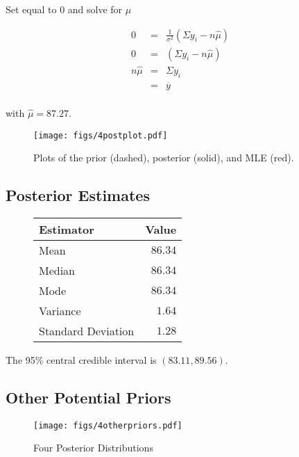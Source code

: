 \documentclass[12pt]{article}
\newcommand{\ybar}{\overline{y}}
\begin{document}
Set equal to 0 and solve for $\hat{\mu}$

\begin{eqnarray*}
0 &=& \frac{1}{\sigma^2}(\Sigma y_i-n\hat{\mu}) \\
0 &=& (\Sigma y_i-n\hat{\mu}) \\
n\hat{\mu} &=& \Sigma y_i \\
&=& \ybar \\
\end{eqnarray*}

with $\hat{\mu}=87.27$.

\begin{figure}[H]
\begin{center}
\texttt{[image: figs/4postplot.pdf]}
\caption{Plots of the prior (dashed), posterior (solid), and MLE (red).}
\end{center}
\end{figure}

\subsection{Posterior Estimates}

\begin{figure}[H]
\begin{center}
\begin{tabular}{l|r}
Estimator & \multicolumn{1}{l}{Value} \\ \hline \hline
Mean               & $86.34$ \\
Median             & $86.34$ \\
Mode               & $86.34$ \\
Variance           & $1.64$ \\
Standard Deviation & $1.28$ \\
\end{tabular}
\end{center}
\end{figure}

\noindent The 95\% central credible interval is $(83.11, 89.56)$.


\subsection{Other Potential Priors}

\begin{figure}[H]
\begin{center}
\texttt{[image: figs/4otherpriors.pdf]}
\caption{Four Posterior Distributions}
\end{center}
\end{figure}
\end{document}
